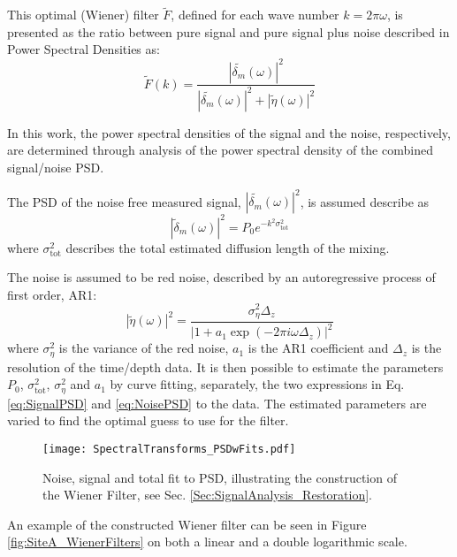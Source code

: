 \documentclass[../../CompleteThesis2/Complete_2ndDraft]{subfiles}
\begin{document}
This optimal (Wiener) filter $\tilde{F}$, defined for each wave number $k = 2\pi \omega$, is presented as the ratio between pure signal and pure signal plus noise described in Power Spectral Densities as:
\begin{equation}
	\tilde{F}(k) =\frac{|\tilde{\delta_m}(\omega)|^2}{|\tilde{\delta_m}(\omega)|^2 + |\tilde{\eta}(\omega)|^2}
	\label{eq:WienerFilter}
\end{equation}

In this work, the power spectral densities of the signal and the noise, respectively, are determined through analysis of the power spectral density of the combined signal/noise PSD.

The PSD of the noise free measured signal, $|\tilde{\delta_m}(\omega)|^2$, is assumed describe as 
\begin{equation}
	|\tilde{\delta}_m(\omega)|^2 = P_0 e^{-k^2 \sigma_{\text{tot}}^2}
	\label{eq:SignalPSD}
\end{equation}
where $\sigma_{\text{tot}}^2$ describes the total estimated diffusion length of the mixing. 

The noise is assumed to be red noise, described by an autoregressive process of first order, AR1:
\begin{equation}
	|\tilde{\eta}(\omega)|^2 = \frac{\sigma_{\eta}^2 \Delta_z}{|1 + a_1 \exp(-2\pi i \omega \Delta_z)|^2}
	\label{eq:NoisePSD}
\end{equation}
where $\sigma_{\eta}^2$ is the variance of the red noise, $a_1$ is the AR1 coefficient and $\Delta_z$ is the resolution of the time/depth data.
It is then possible to estimate the parameters $P_0$, $\sigma_{\text{tot}}^2$, $\sigma_{\eta}^2$ and $a_1$ by curve fitting, separately, the two expressions in Eq. \ref{eq:SignalPSD} and \ref{eq:NoisePSD} to the data. The estimated parameters are varied to find the optimal guess to use for the filter.

\begin{figure}
	\centering
	\texttt{[image: SpectralTransforms\_PSDwFits.pdf]}
	\caption[FFT, DCT, NDCT PSDs with Fit, Site A]{\small Noise, signal and total fit to PSD, illustrating the construction of the Wiener Filter, see Sec. \ref{Sec:SignalAnalysis_Restoration}.}
	\label{fig:SpectralTransforms_PSDwFits}
\end{figure}

An example of the constructed Wiener filter can be seen in Figure \ref{fig:SiteA_WienerFilters} on both a linear and a double logarithmic scale.
\end{document}
